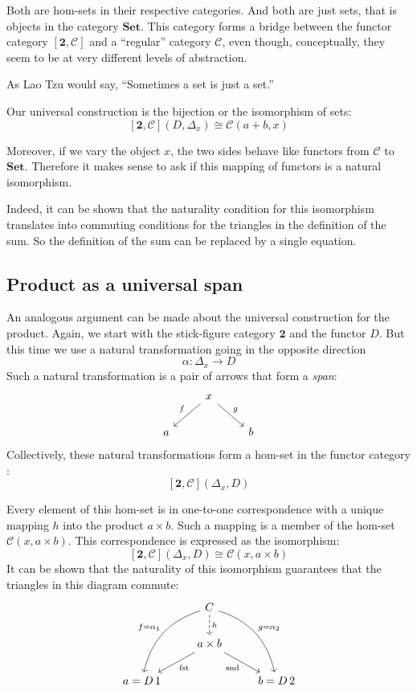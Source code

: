 \documentclass[DaoFP]{subfiles}
\begin{document}
Both are hom-sets in their respective categories. And both are just sets, that is objects in the category $\mathbf{Set}$. This category forms a bridge between the functor category $[\mathbf{2}, \mathcal{C}]$ and a ``regular'' category $\mathcal{C}$, even though, conceptually, they seem to be at very different levels of abstraction. 

As Lao Tzu would say, ``Sometimes a set is just a set.''

Our universal construction is the bijection or the isomorphism of sets:
\[ [\mathbf{2}, \mathcal{C}](D, \Delta_x)  \cong \mathcal{C}(a + b, x) \]

Moreover, if we vary the object $x$, the two sides behave like functors from  $\mathcal{C}$ to $\mathbf{Set}$. Therefore it makes sense to ask if this mapping of functors is a natural isomorphism. 

Indeed, it can be shown that the naturality condition for this isomorphism translates into commuting conditions for the triangles in the definition of the sum. So the definition of the sum can be replaced by a single equation.

\subsection{Product as a universal span}

An analogous argument can be made about the universal construction for the product. Again, we start with the stick-figure category $\mathbf{2}$ and the functor $D$. But this time we use a natural transformation going in the opposite direction
\[ \alpha \colon \Delta_x \to D \]
Such a natural transformation is a pair of arrows that form a \emph{span}:
\[
 \begin{tikzcd}
 &x
 \arrow[dl, "f"']
 \arrow[dr, "g"]
 \\
 a
 && b
  \end{tikzcd}
\]
Collectively, these natural transformations form a hom-set in the functor category :
\[[\mathbf{2}, \mathcal{C}](\Delta_x, D) \]

Every element of this hom-set is in one-to-one correspondence with a unique mapping $h$ into the product $a \times b$. Such a mapping is a member of the hom-set $\mathcal{C}(x, a \times b)$. This correspondence is expressed as the isomorphism:
\[ [\mathbf{2}, \mathcal{C}](\Delta_x, D)  \cong \mathcal{C}(x, a \times b) \]
It can be shown that the naturality of this isomorphism guarantees that the triangles in this diagram commute:
\[
 \begin{tikzcd}
 & C 
\arrow[d, dashed, "h"]
 \arrow[ddl, bend right, "f = \alpha_1"']
 \arrow[ddr, bend left, "g = \alpha_2"]
\\
&a \times b
 \arrow[dl,  "\text{fst}"]
  \arrow[dr,   "\text{snd}"']
\\
a = D\, 1 && b = D \, 2
 \end{tikzcd}
\]
\end{document}

